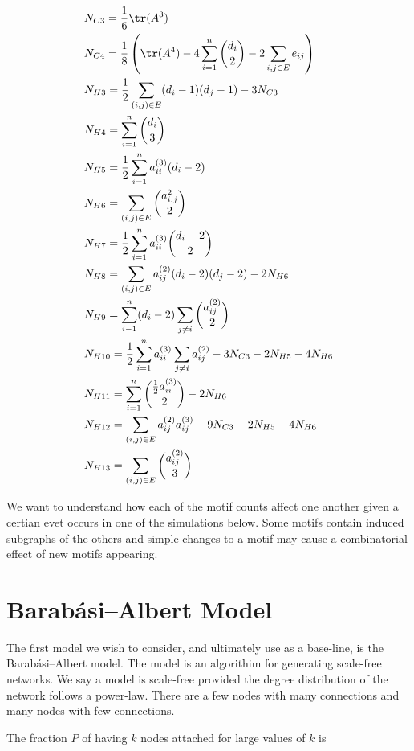 \begin{align*}
    &N_{C3} = \frac{1}{6} \tr({A^3}) \\
    &N_{C4} = \frac{1}{8} \left(\tr(A^4) -4\sum^{n}_{i=1} {d_i \choose 2} - 2\sum_{i,j \in E} e_{ij} \right)\\
    &N_{H3} = \frac{1}{2}\sum_{(i,j)\in E} (d_i - 1)(d_j - 1) - 3 N_{C3} \\
    &N_{H4} = \sum^{n}_{i=1} {d_i \choose 3} \\
    &N_{H5} = \frac{1}{2} \sum^{n}_{i=1} a^{(3)}_{ii} (d_i-2)\\
    &N_{H6} = \sum_{(i,j)\in E}{a^{2}_{i,j} \choose 2 }\\
    &N_{H7} = \frac{1}{2} \sum^{n}_{i=1} a^{(3)}_{ii} {{d_i-2} \choose 2}\\
    &N_{H8} = \sum_{(i,j)\in E} a^{(2)}_{ij} (d_i-2)(d_j-2) - 2 N_{H6}\\
    &N_{H9} = \sum^{n}_{i-1}(d_i-2) \sum_{j \neq i} {a^{(2)}_{ij} \choose 2 }\\
    &N_{H10} = \frac{1}{2}\sum^{n}_{i=1}a^{(3)}_{ii} \sum_{j \neq i} a^{(2)}_{ij} - 3 N_{C3} - 2N_{H5} -4N_{H6}\\
    &N_{H11} = \sum^{n}_{i=1} {\frac{1}{2}a^{(3)}_{ii} \choose 2} - 2N_{H6}\\
    &N_{H12} = \sum_{(i,j)\in E} a^{(2)}_{ij} a^{(3)}_{ij} - 9N_{C3} -2N_{H5}-4N_{H6}\\
    &N_{H13} = \sum_{(i,j)\in E} {a^{(2)}_{ij} \choose 3}\\
\end{align*}



We want to understand how each of the motif counts affect one another given a certian evet occurs
in one of the simulations below. Some motifs contain induced subgraphs of the others and simple changes
to a motif may cause a combinatorial effect of new motifs appearing.

\chapter{Barabási–Albert Model}
The first model we wish to consider, and ultimately use as a base-line, is the Barabási–Albert model. The 
model is an algorithim for generating scale-free networks. We say a model is scale-free provided the 
degree distribution of the network follows a power-law. There are a few nodes with many connections and
many nodes with few connections. 


The fraction $P$ of having $k$ nodes attached for large values of $k$ is 

